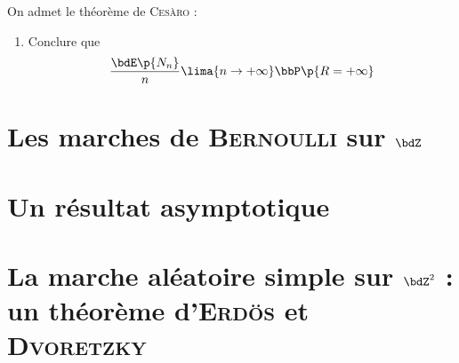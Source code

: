 \documentclass[a4paper,french,bookmarks]{article}
\begin{document}
    On admet le théorème de \textsc{Cesàro} : 
    
    \begin{tcolorbox}[
        breakable,
        enhanced,
        frame hidden,
        interior style      = {fill = main3!10},
        sharp corners       = downhill,
        arc                 = 0 cm,
        boxrule             = 0 cm,
    ]
    \end{tcolorbox}
        
    
    \begin{enumerate}[resume]
        
        \item Conclure que
        \[ \dfrac{\bdE\p{N_n}}{n} \lima{n \to +\infty} \bbP\p{R = +\infty}\]
        
        
    \end{enumerate}
    
    \section{Les marches de \textsc{Bernoulli} sur $\bdZ$}
    
    \section{Un résultat asymptotique}
    
    \section{La marche aléatoire simple sur $\bdZ^2$ : un théorème d'\textsc{Erdös} et \textsc{Dvoretzky}}
    
    
    
\end{document}
